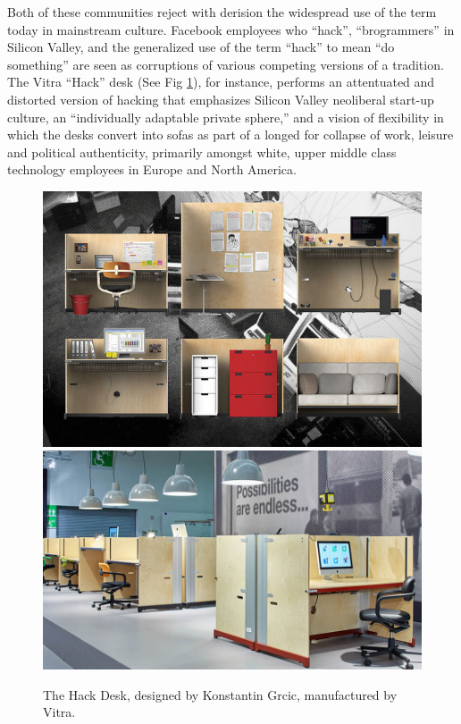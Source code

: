 \documentclass[10pt,letter,oneside]{scrartcl}
\begin{document}
Both of these communities reject with derision the widespread use of the term
today in mainstream culture.  Facebook employees who ``hack'', ``brogrammers''
in Silicon Valley, and the generalized use of the term ``hack'' to mean ``do
something'' are seen as corruptions of various competing versions of a
tradition.  The Vitra ``Hack'' desk (See Fig \ref{fig:hackdeskimage}), for 
instance, performs an attentuated and distorted version of hacking that 
emphasizes Silicon Valley neoliberal start-up culture, an ``individually 
adaptable private sphere,'' and a vision of flexibility in which the 
desks convert into sofas as part of a longed for collapse of work, 
leisure and political authenticity, primarily amongst white, upper 
middle class technology employees in Europe and North America. 



\begin{figure} \centering
\includegraphics[scale=0.4]{images/Workspirit13HACKStudioAKFB3}
\includegraphics[scale=0.25]{images/HackDeskGrcic} \caption{The Hack Desk,
  designed by Konstantin Grcic, manufactured by Vitra.}
\label{fig:hackdeskimage}
\end{figure}
\end{document}
